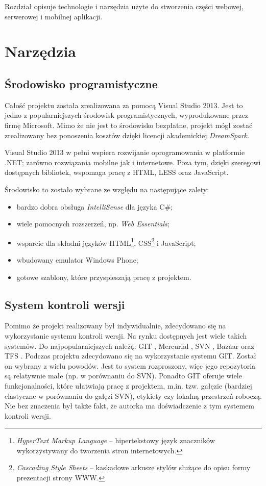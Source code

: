\documentclass[a4paper]{book}
\begin{document}
	Rozdział opisuje technologie i narzędzia użyte do stworzenia części webowej, serwerowej i mobilnej aplikacji.
	
		\section{Narzędzia}		
			\subsection{Środowisko programistyczne}
				
			Całość projektu została zrealizowana za pomocą Visual Studio 2013. Jest to jedno z popularniejszych środowisk programistycznych, wyprodukowane przez firmę Microsoft. Mimo że nie jest to środowisko bezpłatne, projekt mógł zostać zrealizowany bez ponoszenia kosztów dzięki licencji akademickiej \textit{DreamSpark}. 
			
			Visual Studio 2013 w pełni wspiera rozwijanie oprogramowania w platformie .NET; zarówno rozwiązania mobilne jak i internetowe. Poza tym, dzięki szeregowi dostępnych bibliotek, wspomaga pracę z HTML, LESS oraz JavaScript.
			
			Środowisko to zostało wybrane ze względu na następujące zalety:
			\begin{itemize}
				\item bardzo  dobra obsługa \textit{IntelliSense} dla języka C\#;
				\item wiele pomocnych rozszerzeń, np. \textit{Web Essentials};
				\item wsparcie dla składni języków HTML\footnote{\emph{HyperText Markup Language} -- hipertekstowy język znaczników wykorzystywany do tworzenia stron internetowych.}, CSS\footnote{\emph{Cascading Style Sheets} -- kaskadowe arkusze stylów służące do opisu formy prezentacji strony WWW.} i JavaScript;
				\item wbudowany emulator Windows Phone;
				\item gotowe szablony, które przyspieszają pracę z projektem.
			\end{itemize}
			
			\subsection{System kontroli wersji}
			
			Pomimo że projekt realizowany był indywidualnie, zdecydowano się na wykorzystanie systemu kontroli wersji. Na rynku dostępnych jest wiele takich systemów. Do najpopularniejszych należą: GIT \cite{id:GIT}, Mercurial \cite{id:Mecurial}, SVN \cite{id:SVN}, Bazaar \cite{id:Bazaar} oraz TFS \cite{id:TFS}.
			Podczas projektu zdecydowano się na wykorzystanie systemu GIT. Został on wybrany z wielu powodów. Jest to system rozproszony, więc jego repozytoria są relatywnie małe (np. w porównaniu do SVN). Ponadto GIT oferuje wiele funkcjonalności, które ułatwiają pracę z projektem, m.in. tzw. gałęzie (bardziej elastyczne w porównaniu do gałęzi SVN), etykiety czy lokalną przestrzeń roboczą. Nie bez znaczenia był także fakt, że autorka ma doświadczenie z tym systemem kontroli wersji.
\end{document}

